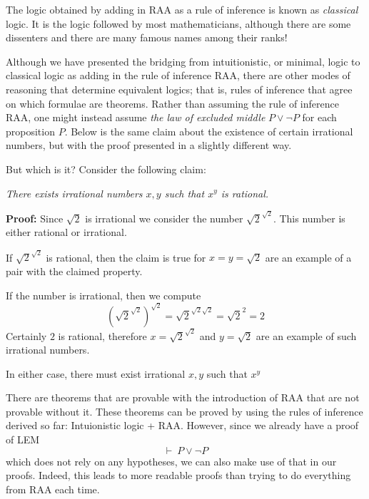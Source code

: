 \documentclass{book}
\begin{document}
    The logic obtained by adding in RAA as a rule of inference is known as \emph{classical} logic. It is the logic followed by most mathematicians, although there are some dissenters and there are many famous names among their ranks! 

    Although we have presented the bridging from intuitionistic, or minimal, logic to classical logic as adding in the rule of inference RAA, there are other modes of reasoning that determine equivalent logics; that is, rules of inference that agree on which formulae are theorems. Rather than assuming the rule of inference RAA, one might instead assume \emph{the law of excluded middle} $P \lor \lnot P$ for each proposition $P$. Below is the same claim about the existence of certain irrational numbers, but with the proof presented in a slightly different way. 

    \begin{eg}{But which is it?}
        Consider the following claim:

            \emph{There exists irrational numbers $x,y$ such that $x^y$ is rational.}

        {\bf Proof:} Since $\sqrt{2}$ is irrational we consider the number $\sqrt{2}^{\sqrt{2}}$. This number is either rational or irrational. 
        
        If $\sqrt{2}^{\sqrt{2}}$ is rational, then the claim is true for $x=y=\sqrt{2}$ are an example of a pair with the claimed property. 
        
        If the number is irrational, then we compute $$(\sqrt{2}^{\sqrt{2}})^{\sqrt{2}} = \sqrt{2}^{\sqrt{2}\sqrt{2}}=\sqrt{2}^{2}=2$$ Certainly $2$ is rational, therefore $x=\sqrt{2}^{\sqrt{2}}$ and $y=\sqrt{2}$ are an example of such irrational numbers. 

        In either case, there must exist irrational $x,y$ such that $x^{y}$
    \end{eg}

    There are theorems that are provable with the introduction of RAA that are not provable without it. These theorems can be proved by using the rules of inference derived so far: Intuionistic logic + RAA. However, since we already have a proof of LEM $$ \vdash \ P \lor \lnot P$$ which does not rely on any hypotheses, we can also make use of that in our proofs. Indeed, this leads to more readable proofs than trying to do everything from RAA each time. 
\end{document}
